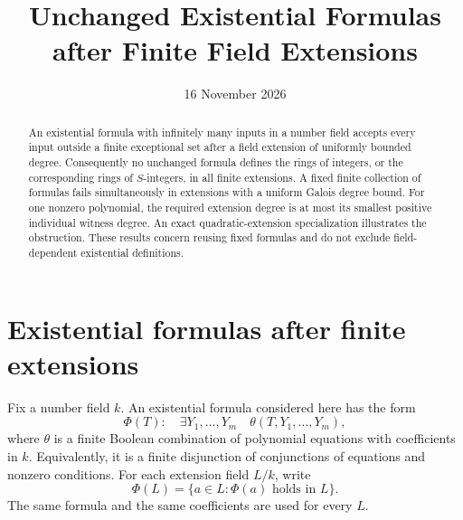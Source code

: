 \documentclass[11pt,a4paper]{article}
\title{Unchanged Existential Formulas after Finite Field Extensions}
\author{}\date{16 November 2026}
\theoremstyle{definition}\newtheorem{definition}[theorem]{Definition}
\theoremstyle{remark}\newtheorem{remark}[theorem]{Remark}
\begin{document}
\maketitle
\begin{abstract}
An existential formula with infinitely many inputs in a number field
accepts every input outside a finite exceptional set after a field
extension of uniformly bounded degree. Consequently no unchanged
formula defines the rings of integers, or the corresponding rings of
$S$-integers, in all finite extensions. A fixed finite collection of
formulas fails simultaneously in extensions with a uniform Galois
degree bound. For one nonzero polynomial, the required extension
degree is at most its smallest positive individual witness degree.
An exact quadratic-extension specialization illustrates the obstruction.
These results concern reusing fixed formulas and do not exclude
field-dependent existential definitions.
\end{abstract}

\section{Existential formulas after finite extensions}

Fix a number field $k$. An existential formula considered here
has the form
\[
 \Phi(T):\quad \exists Y_1,\ldots,Y_m\quad
             \theta(T,Y_1,\ldots,Y_m),
\]
where $\theta$ is a finite Boolean combination of polynomial
equations with coefficients in $k$. Equivalently, it is a finite
disjunction of conjunctions of equations and nonzero conditions.
For each extension field $L/k$, write
\[
                \Phi(L)=\{a\in L:\Phi(a)\text{ holds in }L\}.
\]
The same formula and the same coefficients are used for every $L$.
\end{document}
